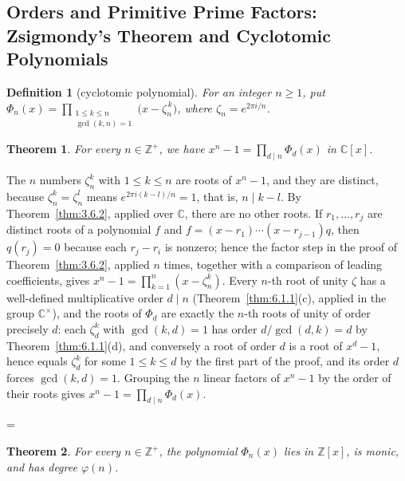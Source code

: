 \documentclass[11pt]{article}
\makeatletter
\theoremstyle{ntstyle}
\newtheorem{theorem}{Theorem}[subsection]
\newtheorem{definition}{Definition}[subsection]
\let\nt@closedisplay\]
\def\nt@guardedclose{\@ifnextchar\par{\nt@closeafterpar}{\@ifnextchar\end{\postdisplaypenalty\@M\nt@closedisplay}{\nt@closedisplay}}}
\def\nt@closeafterpar\par{\@ifnextchar\par{\nt@closeafterpar}{\@ifnextchar\end{\postdisplaypenalty\@M\nt@closedisplay\par}{\nt@closedisplay\par}}}
\renewenvironment{proof}[1][\proofname]{\par
  \pushQED{\qed}\normalfont\topsep\medskipamount\edef\nt@afterproof{\@endparpenalty=\the\@endparpenalty\relax}\@beginparpenalty\@M\@endparpenalty\@M\let\]\nt@guardedclose\trivlist\item[]\textit{#1\@addpunct{.}} \ignorespaces}{\ifvmode\addpenalty\@M\fi\popQED\nt@afterproof\endtrivlist\@endpefalse}
\makeatother
\begin{document}
\subsection{Orders and Primitive Prime Factors: Zsigmondy's Theorem and Cyclotomic Polynomials}

\begin{definition}[cyclotomic polynomial]\label{def:6.11.1}
	For an integer $n\ge1$, put $\Phi_n(x) = \prod_{\substack{1 \le k \le n \\ \gcd(k, n) = 1}}\big(x
		- \zeta_n^{\,k}\big)$, where $\zeta_n = e^{2\pi i / n}$.

\end{definition}
\begin{theorem}\label{thm:6.11.1} For every $n\in\mathbb{Z}^+$, we have $x^{n} - 1 = \prod_{d \mid n} \Phi_d(x)$ in $\mathbb{C}[x]$.

\end{theorem}

\begin{proof} The $n$ numbers $\zeta_n^k$ with $1\le k\le n$ are roots of
	$x^n-1$, and they are distinct, because $\zeta_n^k=\zeta_n^l$ means
	$e^{2\pi i(k-l)/n}=1$, that is, $n\mid k-l$. By Theorem~\ref{thm:3.6.2},
	applied over $\mathbb{C}$, there are no other roots. If $r_1,\ldots,r_j$
	are distinct roots of a polynomial $f$ and $f=(x-r_1)\cdots(x-r_{j-1})q$,
	then $q(r_j)=0$ because each $r_j-r_i$ is nonzero; hence the factor step
	in the proof of Theorem~\ref{thm:3.6.2}, applied $n$ times, together with a
	comparison of leading coefficients, gives
	$x^n-1=\prod_{k=1}^{n}(x-\zeta_n^k)$. Every $n$-th root of unity
	$\zeta$ has a well-defined multiplicative order $d \mid n$
	(Theorem~\ref{thm:6.1.1}(c), applied in the group $\mathbb{C}^{\times}$),
	and the roots of $\Phi_d$ are exactly the $n$-th roots of unity of
	order precisely $d$: each $\zeta_d^k$ with $\gcd(k,d)=1$ has order
	$d/\gcd(d,k)=d$ by Theorem~\ref{thm:6.1.1}(d), and conversely a root of
	order $d$ is a root of $x^d-1$, hence equals $\zeta_d^k$ for some
	$1\le k\le d$ by the first part of the proof, and its order $d$
	forces $\gcd(k,d)=1$. Grouping the $n$ linear factors of $x^{n} - 1$
	by the order of their roots gives $x^{n} - 1 = \prod_{d \mid n} \Phi_d(x)$.

\end{proof}
\begin{theorem}\label{thm:6.11.2} For every $n\in\mathbb{Z}^+$, the polynomial $\Phi_n(x)$ lies in $\mathbb{Z}[x]$, is
	monic, and has degree $\varphi(n)$.

\end{theorem}
\end{document}
